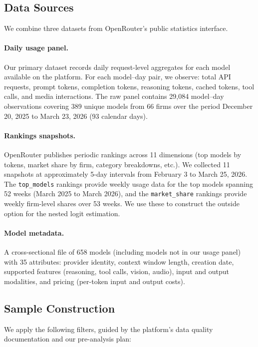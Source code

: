 \documentclass[11pt, a4paper]{article}
\begin{document}
\subsection{Data Sources}

We combine three datasets from OpenRouter's public statistics interface.

\paragraph{Daily usage panel.} Our primary dataset records daily request-level aggregates for each model available on the platform. For each model--day pair, we observe: total API requests, prompt tokens, completion tokens, reasoning tokens, cached tokens, tool calls, and media interactions. The raw panel contains 29,084 model--day observations covering 389 unique models from 66 firms over the period December 20, 2025 to March 23, 2026 (93 calendar days).

\paragraph{Rankings snapshots.} OpenRouter publishes periodic rankings across 11 dimensions (top models by tokens, market share by firm, category breakdowns, etc.). We collected 11 snapshots at approximately 5-day intervals from February 3 to March 25, 2026. The \texttt{top\_models} rankings provide weekly usage data for the top models spanning 52 weeks (March 2025 to March 2026), and the \texttt{market\_share} rankings provide weekly firm-level shares over 53 weeks. We use these to construct the outside option for the nested logit estimation.

\paragraph{Model metadata.} A cross-sectional file of 658 models (including models not in our usage panel) with 35 attributes: provider identity, context window length, creation date, supported features (reasoning, tool calls, vision, audio), input and output modalities, and pricing (per-token input and output costs).

\subsection{Sample Construction}

We apply the following filters, guided by the platform's data quality documentation and our pre-analysis plan:
\end{document}
